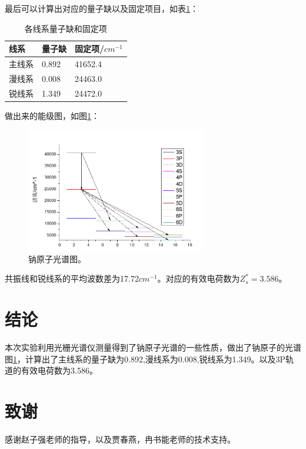 \documentclass[aps,pre,12pt,preprint,onecolumn,showpacs,showkeys,UTF8]{revtex4-1}
\begin{document}
最后可以计算出对应的量子缺以及固定项目，如表\ref{table2}：
\begin{center}
	\begin{table}
		\caption{各线系量子缺和固定项}
		\label{table2}
		\begin{tabular}{m{4cm}<{\centering}m{4cm}<{\centering}m{4cm}<{\centering}}
			\hline
			\hline
			线系&量子缺&固定项/$cm^{-1}$\\
			\hline
			主线系&0.892&41652.4\\
			漫线系&0.008&24463.0\\
			锐线系&1.349&24472.0\\
			\hline
			\hline
		\end{tabular}
	\end{table}
\end{center}

做出来的能级图，如图\ref{fig:exp1}：
\begin{figure}[h]
	\begin{center}
		\includegraphics[width=0.7\textwidth]{pic2.png}
		\caption{\label{fig:exp1}钠原子光谱图。}
	\end{center}
\end{figure}

共振线和锐线系的平均波数差为17.72$cm^{-1}$。对应的有效电荷数为$Z_s^*=3.586$。


\section{结论}

本次实验利用光栅光谱仪测量得到了钠原子光谱的一些性质，做出了钠原子的光谱图\ref{fig:exp1}，计算出了主线系的量子缺为0.892,漫线系为0.008,锐线系为1.349。以及3P轨道的有效电荷数为3.586。

\section{致谢} 
感谢赵子强老师的指导，以及贾春燕，冉书能老师的技术支持。
\end{document}
